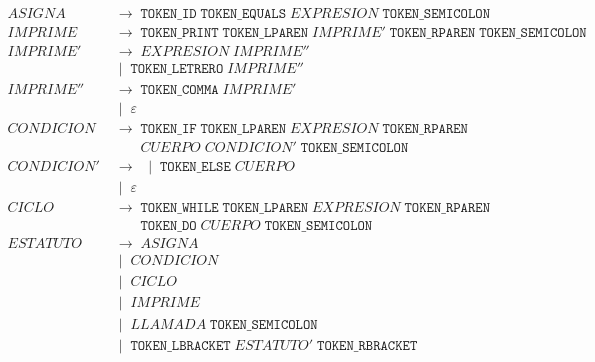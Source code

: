 \documentclass[12pt, letterpaper]{article}
\theoremstyle{definition}
\newcommand{\produce}{\;\longrightarrow\;}
\newcommand{\OR}{\;\mid\;}
\begin{document}
\small{
    \begin{align}
    \mathit{ASIGNA} &\produce \texttt{TOKEN\_ID}\;\texttt{TOKEN\_EQUALS}\;%
    \mathit{EXPRESION}\;\texttt{TOKEN\_SEMICOLON}  \\[3pt]
    \mathit{IMPRIME} &\produce \texttt{TOKEN\_PRINT}\;\texttt{TOKEN\_LPAREN}\;%
                    \mathit{IMPRIME'}\;\texttt{TOKEN\_RPAREN}\;\texttt{TOKEN\_SEMICOLON}\\[3pt]
    \mathit{IMPRIME'} &\produce \mathit{EXPRESION}\; \mathit{IMPRIME''} \\
                       & \OR \texttt{TOKEN\_LETRERO}\; \mathit{IMPRIME''}  \nonumber \\[3pt]
    \mathit{IMPRIME''} &\produce \texttt{TOKEN\_COMMA}\; \mathit{IMPRIME'} \\
                       & \OR \varepsilon  \nonumber \\[3pt]
    \mathit{CONDICION} &\produce \texttt{TOKEN\_IF}\;\texttt{TOKEN\_LPAREN}\;%
                                  \mathit{EXPRESION}\;\texttt{TOKEN\_RPAREN} \ \\
                         &\phantom{{}\produce{}}%
                           \mathit{CUERPO}\; \mathit{CONDICION'}\; \texttt{TOKEN\_SEMICOLON}\; \nonumber \label{p:condicion} \\[3pt]
    \mathit{CONDICION'} &\produce \OR  \texttt{TOKEN\_ELSE}\; \mathit{CUERPO}\; \\ 
    & \OR \varepsilon \nonumber \\[3pt]
    \mathit{CICLO} &\produce \texttt{TOKEN\_WHILE}\;\texttt{TOKEN\_LPAREN}\;%
                              \mathit{EXPRESION}\;\texttt{TOKEN\_RPAREN}  \\
                   &\phantom{{}\produce{}}%
                      \texttt{TOKEN\_DO}\;\mathit{CUERPO}\; \texttt{TOKEN\_SEMICOLON} \nonumber \label{p:ciclo} \\[3pt]
    \mathit{ESTATUTO} &\produce \mathit{ASIGNA} \\
                      & \OR \mathit{CONDICION} \nonumber\\
                      & \OR \mathit{CICLO} \nonumber \\
                      &\OR \mathit{IMPRIME} \nonumber\\
                      & \OR \mathit{LLAMADA}\;\texttt{TOKEN\_SEMICOLON} \nonumber\\
                      & \OR  \texttt{TOKEN\_LBRACKET}\;\mathit{ESTATUTO'}\; \texttt{TOKEN\_RBRACKET}\nonumber \\[3pt]

\end{align}}
\end{document}
